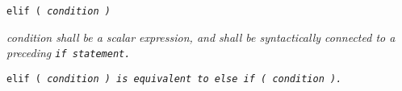 
\tt{elif (} \it{condition} \tt{)}


\it{condition} shall be a scalar expression,
and  shall be syntactically connected to a preceding \tt{if} statement.


\tt{elif (} \it{condition} \tt{)} is equivalent
to \tt{else if (} \it{condition} \tt{)}.
